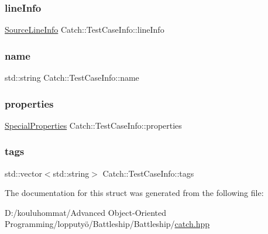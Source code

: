 \subsubsection{\texorpdfstring{line\+Info}{lineInfo}}
{\footnotesize\ttfamily \mbox{\hyperlink{struct_catch_1_1_source_line_info}{Source\+Line\+Info}} Catch\+::\+Test\+Case\+Info\+::line\+Info}

\mbox{\label{struct_catch_1_1_test_case_info_a463794e2f5cfead307c93efd134ade36}} 
\subsubsection{\texorpdfstring{name}{name}}
{\footnotesize\ttfamily std\+::string Catch\+::\+Test\+Case\+Info\+::name}

\mbox{\label{struct_catch_1_1_test_case_info_afc1e84bd7a2e180895a06d9131302af0}} 
\subsubsection{\texorpdfstring{properties}{properties}}
{\footnotesize\ttfamily \mbox{\hyperlink{struct_catch_1_1_test_case_info_a39b232f74b4a7a6f2183b96759027eac}{Special\+Properties}} Catch\+::\+Test\+Case\+Info\+::properties}

\mbox{\label{struct_catch_1_1_test_case_info_a150a7cbca1dd0c91799ccb14ff822eb0}} 
\subsubsection{\texorpdfstring{tags}{tags}}
{\footnotesize\ttfamily std\+::vector$<$std\+::string$>$ Catch\+::\+Test\+Case\+Info\+::tags}



The documentation for this struct was generated from the following file\+:\begin{DoxyCompactItemize}
\item 
D\+:/kouluhommat/\+Advanced Object-\/\+Oriented Programming/lopputyö/\+Battleship/\+Battleship/\mbox{\hyperlink{catch_8hpp}{catch.\+hpp}}\end{DoxyCompactItemize}
